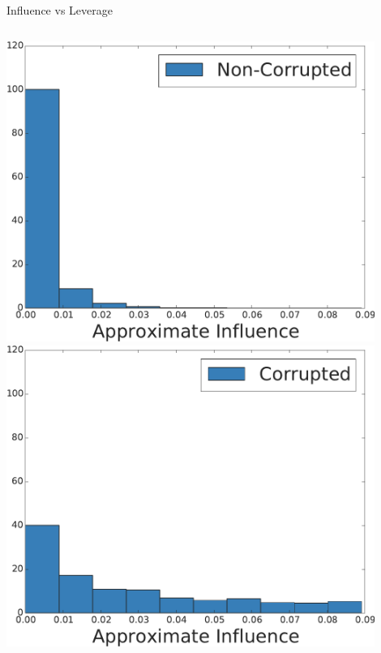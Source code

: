 \documentclass[final,t,english,professionalfonts, xcolor=dvipsnames]{beamer}
\begin{document}
\begin{frame}{}
{\begin{minipage}[c]{0.96\linewidth}
\begin{columns}[t]
\begin{column}{.33\linewidth}
\begin{exampleblock}{Influence vs Leverage}
\begin{columns}
\includegraphics[width=0.9\textwidth,keepaspectratio=false]{figures/hist_corrupted-n_corruptions-3000_approximate-influence_non-corrupted-points.pdf}\\
\includegraphics[width=0.9\textwidth,keepaspectratio=false]{figures/hist_corrupted-n_corruptions-3000_approximate-influence_corrupted-points.pdf}
\end{columns}
\end{exampleblock}


\end{column}
\end{columns}
\end{minipage}}
\end{frame}
\end{document}
